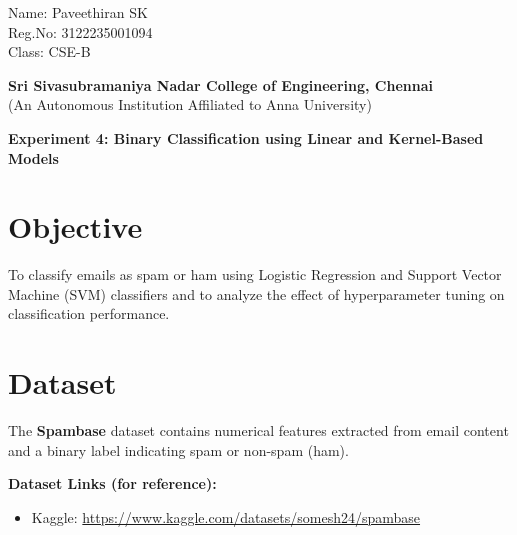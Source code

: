 \documentclass[11pt]{article}
\begin{document}
{
\raggedleft
Name: Paveethiran SK\\
Reg.No: 3122235001094\\
Class: CSE-B\\
}

\begin{center}
    \large \textbf{Sri Sivasubramaniya Nadar College of Engineering, Chennai} \\
    (An Autonomous Institution Affiliated to Anna University) \\
    \vspace{0.3cm}
\end{center}

\begin{table}[!h]
\centering
\renewcommand{\arraystretch}{1.5}
\end{table}

\begin{center}
\textbf{Experiment 4: Binary Classification using Linear and Kernel-Based Models}
\end{center}

\section*{Objective}
To classify emails as spam or ham using Logistic Regression and Support Vector Machine (SVM) classifiers and to analyze the effect of hyperparameter tuning on classification performance.

\section*{Dataset}
The \textbf{Spambase} dataset contains numerical features extracted from email content and a binary label indicating spam or non-spam (ham).

\textbf{Dataset Links (for reference):}
\begin{itemize}
    \item Kaggle: \href{https://www.kaggle.com/datasets/somesh24/spambase}{https://www.kaggle.com/datasets/somesh24/spambase}
\end{itemize}
\end{document}
